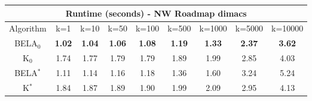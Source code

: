 \begin{tabular}{c|cccccccc}\toprule
\multicolumn{9}{c}{Runtime (seconds) - NW Roadmap dimacs}\\ \midrule
Algorithm & k=1 & k=10 & k=50 & k=100 & k=500 & k=1000 & k=5000 & k=10000 \\ \midrule
BELA$_0$ & \textbf{1.02} & \textbf{1.04} & \textbf{1.06} & \textbf{1.08} & \textbf{1.19} & \textbf{1.33} & \textbf{2.37} & \textbf{3.62} \\
K$_0$ & 1.74 & 1.77 & 1.79 & 1.79 & 1.89 & 1.99 & 2.85 & 4.03 \\
BELA$^*$ & 1.11 & 1.14 & 1.16 & 1.18 & 1.36 & 1.60 & 3.24 & 5.24 \\
K$^*$ & 1.84 & 1.87 & 1.89 & 1.90 & 1.99 & 2.09 & 2.95 & 4.13 \\ \bottomrule 
\end{tabular}
